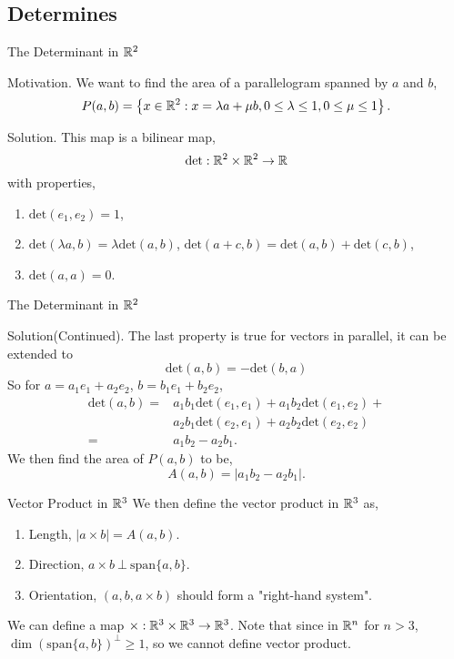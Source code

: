 \documentclass[hyperref={pdfpagelabels=true}]{beamer}
\newcommand{\<}{\langle}
\renewcommand{\>}{\rangle}
\begin{document}
\subsection{Determines}
\begin{frame}{The Determinant in $\mathbb{R}^{2}$}
    \begin{block}{Motivation.}
        We want to find the area of a parallelogram spanned by $a$ and $b$,
        \[P(a,b) = \left\{x \in \mathbb{R}^{2}:x = \lambda a+\mu b,0 \leq \lambda \leq 1,0 \leq \mu \leq 1\right\}.\]
    \end{block}
    \begin{block}{Solution.}
        This map is a bilinear map,
        \[\text{det}:\mathbb{R}^{2} \times \mathbb{R}^{2} \rightarrow \mathbb{R}\]
        with properties,
        \begin{enumerate}
            \item $\text{det}(e_{1},e_{2}) = 1$,
            \item $\text{det}(\lambda a,b) = \lambda \text{det}(a,b)$, $\text{det}(a+c,b) = \text{det}(a,b)+\text{det}(c,b)$,
            \item $\text{det}(a,a) = 0$.
        \end{enumerate}
    \end{block}
\end{frame}
\begin{frame}{The Determinant in $\mathbb{R}^{2}$}
    \begin{block}{Solution(Continued).}
        The last property is true for vectors in parallel, it can be extended to 
        \[
            \text{det}(a,b) = -\text{det}(b,a)
        \]
        So for $a = a_{1}e_{1}+a_{2}e_{2}$, $b = b_{1}e_{1}+b_{2}e_{2}$,
        \[
            \begin{aligned}
                \text{det}(a,b) = &a_{1}b_{1}\text{det}(e_{1},e_{1})+a_{1}b_{2}\text{det}(e_{1},e_{2})+\\
                &a_{2}b_{1}\text{det}(e_{2},e_{1})+a_{2}b_{2}\text{det}(e_{2},e_{2})\\
                = &a_{1}b_{2}-a_{2}b_{1}.
            \end{aligned}
        \]
        We then find the area of $P(a,b)$ to be,
        \[A(a,b) = |a_{1}b_{2}-a_{2}b_{1}|.\]
        \end{block}
    \end{frame}
    \begin{frame}{Vector Product in $\mathbb{R}^{3}$}
        We then define the vector product in $\mathbb{R}^{3}$ as,
        \begin{enumerate}
            \item Length, $|a \times b| = A(a,b)$.
            \item Direction, $a \times b\  \bot\  \text{span}\{a,b\}.$
            \item Orientation, $(a,b,a \times b)$ should form a "right-hand system".
        \end{enumerate}
        We can define a map $\times:\mathbb{R}^{3} \times \mathbb{R}^{3} \rightarrow \mathbb{R}^{3}$.
        Note that since in $\mathbb{R}^{n}$ for $n > 3$, $\dim (\text{span}\{a,b\})^{\bot} \geq 1$, so we cannot define vector product.
    \end{frame}
\end{document}
